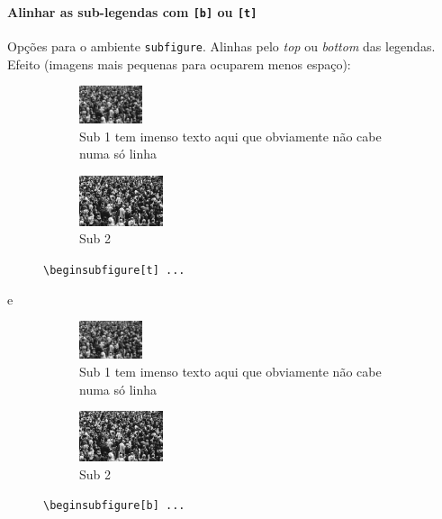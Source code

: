 \documentclass[11pt]{article}
\begin{document}
\paragraph{Alinhar as sub-legendas com \texttt{[b]} ou \texttt{[t]}}
Opções para o ambiente \texttt{subfigure}. Alinhas pelo \textit{top} ou
\textit{bottom} das legendas.
Efeito (imagens mais pequenas para ocuparem menos espaço):
\begin{figure}[H]
    \centering
    \begin{subfigure}[t]{0.49\textwidth}
        \centering
        \includegraphics[height=3em]{graphics/crowd.jpg}
        \caption{Sub 1 tem imenso texto aqui que obviamente não cabe numa só linha}
        \label{fig:sub1}
    \end{subfigure}
    \begin{subfigure}[t]{0.49\textwidth}
        \centering
        \includegraphics[height=4em]{graphics/crowd.jpg}
        \caption{Sub 2}
        \label{fig:sub2}
    \end{subfigure}
    \caption{\texttt{\textbackslash begin{subfigure}[t] ...}}
    \label{fig:big-figure}
\end{figure}
e
\begin{figure}[H]
    \centering
    \begin{subfigure}[b]{0.49\textwidth}
        \centering
        \includegraphics[height=3em]{graphics/crowd.jpg}
        \caption{Sub 1 tem imenso texto aqui que obviamente não cabe numa só linha}
        \label{fig:sub1}
    \end{subfigure}
    \begin{subfigure}[b]{0.49\textwidth}
        \centering
        \includegraphics[height=4em]{graphics/crowd.jpg}
        \caption{Sub 2}
        \label{fig:sub2}
    \end{subfigure}
    \caption{\texttt{\textbackslash begin{subfigure}[b] ...}}
    \label{fig:big-figure}
\end{figure}
\end{document}
